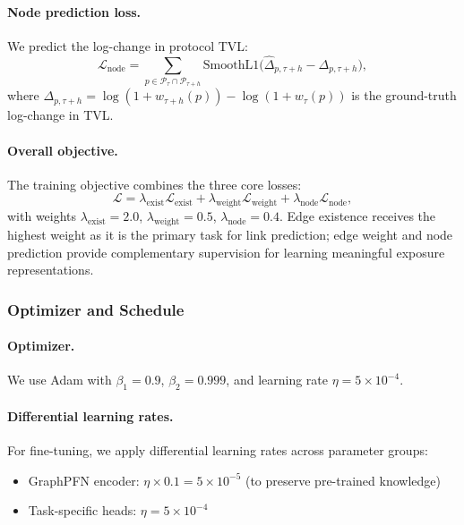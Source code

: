 \paragraph{Node prediction loss.}
We predict the log-change in protocol TVL:
\begin{equation}
\mathcal L_{\mathrm{node}} = \sum_{p \in \mathcal P_{\tau} \cap \mathcal P_{\tau+h}} \mathrm{SmoothL1}\bigl(\widehat{\Delta}_{p,\tau+h} - \Delta_{p,\tau+h}\bigr),
\label{eq:loss-node}
\end{equation}
where $\Delta_{p,\tau+h} = \log(1+w_{\tau+h}(p)) - \log(1+w_{\tau}(p))$ is the ground-truth log-change in TVL.

\paragraph{Overall objective.}
The training objective combines the three core losses:
\begin{equation}
\mathcal L = \lambda_{\mathrm{exist}} \mathcal L_{\mathrm{exist}} + \lambda_{\mathrm{weight}} \mathcal L_{\mathrm{weight}} + \lambda_{\mathrm{node}} \mathcal L_{\mathrm{node}},
\label{eq:loss-total}
\end{equation}
with weights $\lambda_{\mathrm{exist}} = 2.0$, $\lambda_{\mathrm{weight}} = 0.5$, $\lambda_{\mathrm{node}} = 0.4$. Edge existence receives the highest weight as it is the primary task for link prediction; edge weight and node prediction provide complementary supervision for learning meaningful exposure representations.

\subsubsection{Optimizer and Schedule}

\paragraph{Optimizer.}
We use Adam with $\beta_1=0.9$, $\beta_2=0.999$, and learning rate $\eta = 5 \times 10^{-4}$.

\paragraph{Differential learning rates.}
For fine-tuning, we apply differential learning rates across parameter groups:
\begin{itemize}
  \item GraphPFN encoder: $\eta \times 0.1 = 5 \times 10^{-5}$ (to preserve pre-trained knowledge)
  \item Task-specific heads: $\eta = 5 \times 10^{-4}$
\end{itemize}

